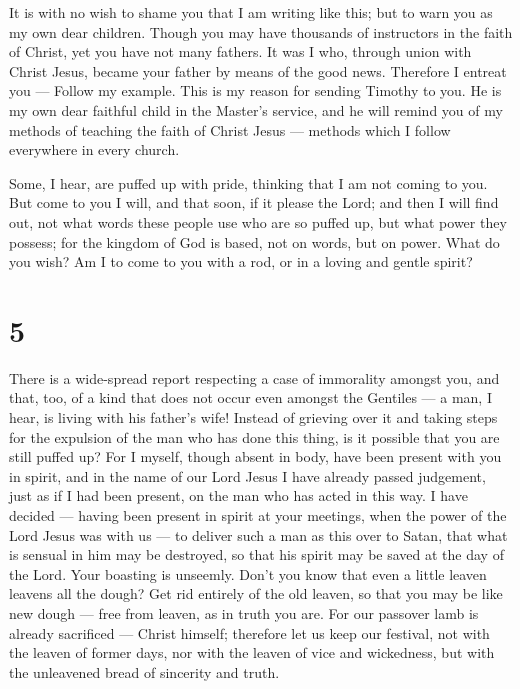  It is with no wish to shame you that I am writing like
this; but to warn you as my own dear children.  Though you
may have thousands of instructors in the faith of Christ, yet you have
not many fathers. It was I who, through union with Christ Jesus, became
your father by means of the good news.  Therefore I entreat
you --- Follow my example.  This is my reason for sending
Timothy to you. He is my own dear faithful child in the Master's
service, and he will remind you of my methods of teaching the faith of
Christ Jesus --- methods which I follow everywhere in every church.

 Some, I hear, are puffed up with pride, thinking that I am
not coming to you.  But come to you I will, and that soon,
if it please the Lord; and then I will find out, not what words these
people use who are so puffed up, but what power they possess;
 for the kingdom of God is based, not on words, but on
power.  What do you wish? Am I to come to you with a rod,
or in a loving and gentle spirit?

\hypertarget{section-4}{%
\section{5}\label{section-4}}

 There is a wide-spread report respecting a case of
immorality amongst you, and that, too, of a kind that does not occur
even amongst the Gentiles --- a man, I hear, is living with his father's
wife!  Instead of grieving over it and taking steps for the
expulsion of the man who has done this thing, is it possible that you
are still puffed up?  For I myself, though absent in body,
have been present with you in spirit, and in the name of our Lord Jesus
I have already passed judgement, just as if I had been present, on the
man who has acted in this way.  I have decided --- having
been present in spirit at your meetings, when the power of the Lord
Jesus was with us ---  to deliver such a man as this over to
Satan, that what is sensual in him may be destroyed, so that his spirit
may be saved at the day of the Lord.  Your boasting is
unseemly. Don't you know that even a little leaven leavens all the
dough?  Get rid entirely of the old leaven, so that you may
be like new dough --- free from leaven, as in truth you are. For our
passover lamb is already sacrificed --- Christ himself; 
therefore let us keep our festival, not with the leaven of former days,
nor with the leaven of vice and wickedness, but with the unleavened
bread of sincerity and truth.

